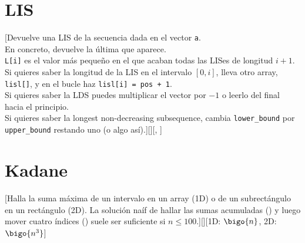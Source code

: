 \section{LIS}
%
	[Devuelve una LIS de la secuencia dada en el vector \texttt{a}.\\
	 En concreto, devuelve la última que aparece.\\
	 \texttt{L[i]} es el valor más pequeño en el que acaban todas las LISes de longitud $i + 1$.\\
	 Si quieres saber la longitud de la LIS en el intervalo $[0, i]$, lleva otro array, \texttt{lisl[]}, y en el bucle haz \texttt{lisl[i] = pos + 1}.\\
	 Si quieres saber la LDS puedes multiplicar el vector por $-1$ o leerlo del final hacia el principio.\\
	 Si quieres saber la longest non-decreasing subsequence, cambia \texttt{lower\_bound} por \texttt{upper\_bound} restando uno (o algo así).][][, ]

\section {Kadane}
%
[Halla la suma máxima de un intervalo en un array (1D) o de un subrectángulo en un rectángulo (2D). La solución naíf de hallar las sumas acumuladas () y luego mover cuatro índices () suele ser suficiente si $n \leq 100$.][][1D: $\bigo{n}$, 2D: $\bigo{n^{3}}$]

